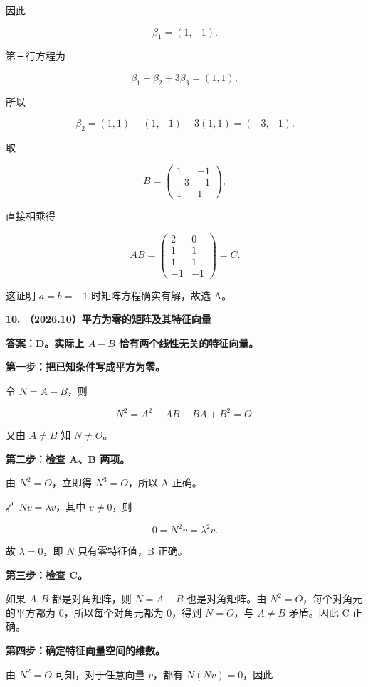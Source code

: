 \documentclass[UTF8,11pt,fontset=windows]{ctexart}
\begin{document}
因此

$$
\beta_1=(1,-1).
$$

第三行方程为

$$
\beta_1+\beta_2+3\beta_3=(1,1),
$$

所以

$$
\beta_2=(1,1)-(1,-1)-3(1,1)=(-3,-1).
$$

取

$$
B=\begin{pmatrix}1&-1\\-3&-1\\1&1\end{pmatrix},
$$

直接相乘得

$$
AB=\begin{pmatrix}2&0\\1&1\\1&1\\-1&-1\end{pmatrix}=C.
$$

这证明 $a=b=-1$ 时矩阵方程确实有解，故选 A。

\clearpage

\textbf{10. （2026.10）平方为零的矩阵及其特征向量}

\textbf{答案：D。实际上 $A-B$ 恰有两个线性无关的特征向量。}

\textbf{第一步：把已知条件写成平方为零。}

令 $N=A-B$，则

$$
N^2=A^2-AB-BA+B^2=O.
$$

又由 $A\ne B$ 知 $N\ne O$。

\textbf{第二步：检查 A、B 两项。}

由 $N^2=O$，立即得 $N^3=O$，所以 A 正确。

若 $Nv=\lambda v$，其中 $v\ne0$，则

$$
0=N^2v=\lambda^2v.
$$

故 $\lambda=0$，即 $N$ 只有零特征值，B 正确。

\textbf{第三步：检查 C。}

如果 $A,B$ 都是对角矩阵，则 $N=A-B$ 也是对角矩阵。由 $N^2=O$，每个对角元的平方都为 $0$，所以每个对角元都为 $0$，得到 $N=O$，与 $A\ne B$ 矛盾。因此 C 正确。

\textbf{第四步：确定特征向量空间的维数。}

由 $N^2=O$ 可知，对于任意向量 $v$，都有 $N(Nv)=0$，因此
\end{document}
